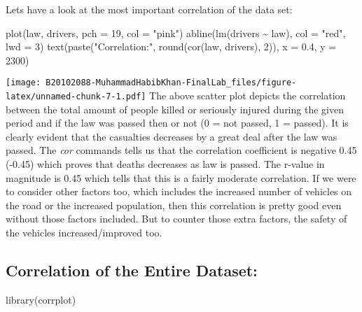 \documentclass[
]{article}
\newenvironment{Shaded}{\begin{snugshade}}{\end{snugshade}}
\newcommand{\AttributeTok}[1]{\textcolor[rgb]{0.77,0.63,0.00}{#1}}
\newcommand{\DecValTok}[1]{\textcolor[rgb]{0.00,0.00,0.81}{#1}}
\newcommand{\FloatTok}[1]{\textcolor[rgb]{0.00,0.00,0.81}{#1}}
\newcommand{\FunctionTok}[1]{\textcolor[rgb]{0.00,0.00,0.00}{#1}}
\newcommand{\NormalTok}[1]{#1}
\newcommand{\SpecialCharTok}[1]{\textcolor[rgb]{0.00,0.00,0.00}{#1}}
\newcommand{\StringTok}[1]{\textcolor[rgb]{0.31,0.60,0.02}{#1}}
\begin{document}
Lets have a look at the most important correlation of the data set:

\begin{Shaded}
\begin{Highlighting}[]
\FunctionTok{plot}\NormalTok{(law, drivers, }\AttributeTok{pch =} \DecValTok{19}\NormalTok{, }\AttributeTok{col =} \StringTok{"pink"}\NormalTok{)}
\FunctionTok{abline}\NormalTok{(}\FunctionTok{lm}\NormalTok{(drivers }\SpecialCharTok{\textasciitilde{}}\NormalTok{ law), }\AttributeTok{col =} \StringTok{"red"}\NormalTok{, }\AttributeTok{lwd =} \DecValTok{3}\NormalTok{)}
\FunctionTok{text}\NormalTok{(}\FunctionTok{paste}\NormalTok{(}\StringTok{"Correlation:"}\NormalTok{, }\FunctionTok{round}\NormalTok{(}\FunctionTok{cor}\NormalTok{(law, drivers), }\DecValTok{2}\NormalTok{)), }\AttributeTok{x =} \FloatTok{0.4}\NormalTok{, }\AttributeTok{y =} \DecValTok{2300}\NormalTok{)}
\end{Highlighting}
\end{Shaded}

\texttt{[image: B20102088-MuhammadHabibKhan-FinalLab\_files/figure-latex/unnamed-chunk-7-1.pdf]}
The above scatter plot depicts the correlation between the total amount
of people killed or seriously injured during the given period and if the
law was passed then or not (0 = not passed, 1 = passed). It is clearly
evident that the casualties decreases by a great deal after the law was
passed. The \emph{cor} commands tells us that the correlation
coefficient is negative 0.45 (-0.45) which proves that deaths decreases
as law is passed. The r-value in magnitude is 0.45 which tells that this
is a fairly moderate correlation. If we were to consider other factors
too, which includes the increased number of vehicles on the road or the
increased population, then this correlation is pretty good even without
those factors included. But to counter those extra factors, the safety
of the vehicles increased/improved too.

\hypertarget{correlation-of-the-entire-dataset}{%
\subsection{Correlation of the Entire
Dataset:}\label{correlation-of-the-entire-dataset}}

\begin{Shaded}
\begin{Highlighting}[]
\FunctionTok{library}\NormalTok{(corrplot)}
\end{Highlighting}
\end{Shaded}
\end{document}
